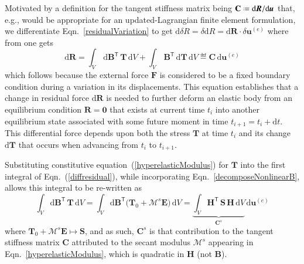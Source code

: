 Motivated by a definition for the tangent stiffness matrix being $\mathbf{C} \defeq \mathrm{d}\boldsymbol{R} / \mathrm{d}\boldsymbol{u}$ that, e.g., would be appropriate for an updated-Lagrangian finite element formulation, \cite{Belytschkoetal00} we differentiate Eqn.~\eqref{residualVariation} to get $\mathrm{d} \delta R = \delta \mathrm{d} R = \mathrm{d} \boldsymbol{R} \cdot \delta \boldsymbol{u}^{(e)}$ where from one gets
\begin{equation}
    \mathrm{d} \boldsymbol{R} = \int_{V} \, \mathrm{d} \mathbf{B}^{\mathsf{T}} \, \boldsymbol{T} \, \mathrm{d} V + \int_{V} \, \mathbf{B}^{\mathsf{T}} \, \mathrm{d} \boldsymbol{T} \, \mathrm{d} V \eqdef \mathbf{C} \, \mathrm{d} \boldsymbol{u}^{(e)} 
    \label{diffresidual}
\end{equation}
which follows because the external force $\boldsymbol{F}$ is considered to be a fixed boundary condition during a variation in its displacements.  This equation establishes that a change in residual force $\mathrm{d}\boldsymbol{R}$ is needed to further deform an elastic body from an equilibrium condition $\boldsymbol{R} = \mathbf{0}$ that exists at current time $t_i$ into another equilibrium state associated with some future moment in time $t_{i+1} = t_i + \mathrm{d}t$.  This differential force depends upon both the stress $\boldsymbol{T}$ at time $t_i$ and its change $\mathrm{d} \boldsymbol{T}$ that occurs when advancing from $t_i$ to $t_{i+1}$.

Substituting constitutive equation~(\ref{hyperelasticModulus}) for $\boldsymbol{T}$ into the first integral of Eqn.~(\ref{diffresidual}), while incorporating Eqn.~\eqref{decomposeNonlinearB}, allows this integral to be re-written as
\begin{equation}
\int_V \mathrm{d} \mathbf{B}^{\mathsf{T}} \, \boldsymbol{T} \, \mathrm{d}V =
\int_V \mathrm{d} \mathbf{B}^{\mathsf{T}} \bigl( \boldsymbol{T}_0 + 
\boldsymbol{\mathcal{M}}^s \boldsymbol{E} \bigr) \, \mathrm{d}V =  
\underbrace{\int_V \mathbf{H}^{\mathsf{T}} \, \mathbf{S} \, \mathbf{H} \, \mathrm{d}V}_{\mathbf{C}^s}  \, \mathrm{d} \boldsymbol{u}^{(e)}
\label{secantStiffness}
\end{equation}
where $\boldsymbol{T}_0 + \boldsymbol{\mathcal{M}}^s \boldsymbol{E} \mapsto \mathbf{S}$, and as such, $\mathbf{C}^s$ is that contribution to the tangent stiffness matrix $\mathbf{C}$ attributed to the secant modulus $\boldsymbol{\mathcal{M}}^s$ appearing in Eqn.~\eqref{hyperelasticModulus}, which is quadratic in $\mathbf{H}$ (not $\mathbf{B}$).

